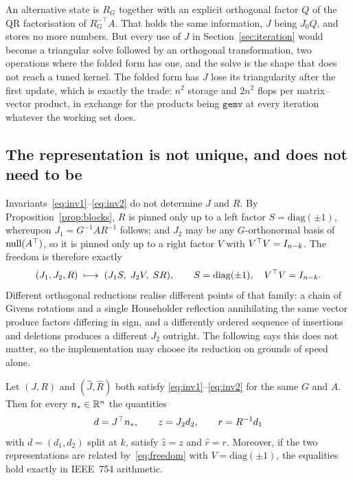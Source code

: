 \begin{remark}\label{rem:fold}
An alternative state is $R_G$ together with an explicit orthogonal factor $Q$ of
the QR factorisation of $R_G^{-\top} A$. That holds the same information, $J$ being $J_0 Q$, and stores no more numbers. But every use of $J$ in
Section~\ref{sec:iteration} would become a triangular solve followed by an
orthogonal transformation, two operations where the folded form has one, and the
solve is the shape that does not reach a tuned kernel. The folded form has $J$
lose its triangularity after the first update, which is exactly the trade: $n^2$
storage and $2n^2$ flops per matrix--vector product, in exchange for the products
being $\texttt{gemv}$ at every iteration whatever the working set does.
\end{remark}

\subsection{The representation is not unique, and does not need to be}

Invariants~\eqref{eq:inv1}--\eqref{eq:inv2} do not determine $J$ and $R$. By
Proposition~\ref{prop:blocks}, $R$ is pinned only up to a left factor
$S = \mathrm{diag}(\pm1)$, whereupon $J_1 = G^{-1}AR^{-1}$ follows; and $J_2$ may
be any $G$-orthonormal basis of $\operatorname{null}(A^{\top})$, so it is pinned only up to a right
factor $V$ with $V^{\top} V = I_{n-k}$. The freedom is therefore exactly
\begin{equation}
  (J_1, J_2, R) \;\longmapsto\; (J_1 S,\; J_2 V,\; S R),
  \qquad S = \mathrm{diag}(\pm 1),\quad V^{\top} V = I_{n-k}.
  \label{eq:freedom}
\end{equation}
Different orthogonal reductions realise different points of that family: a chain
of Givens rotations and a single Householder reflection annihilating the same
vector produce factors differing in sign, and a differently ordered sequence of
insertions and deletions produces a different $J_2$ outright. The following says
this does not matter, so the implementation may choose its reduction on grounds of
speed alone.

\begin{proposition}\label{prop:invariance}
Let $(J,R)$ and $(\hat J,\hat R)$ both satisfy
\eqref{eq:inv1}--\eqref{eq:inv2} for the same $G$ and $A$. Then for every
$n_* \in \mathbb{R}^n$ the quantities
\begin{equation}
  d = J^{\top} n_*, \qquad z = J_2 d_2, \qquad r = R^{-1} d_1
  \label{eq:dzr}
\end{equation}
with $d = (d_1,d_2)$ split at $k$, satisfy $\hat z = z$ and $\hat r = r$.
Moreover, if the two representations are related by~\eqref{eq:freedom} with
$V = \mathrm{diag}(\pm 1)$, the equalities hold exactly in IEEE~754 arithmetic.
\end{proposition}

